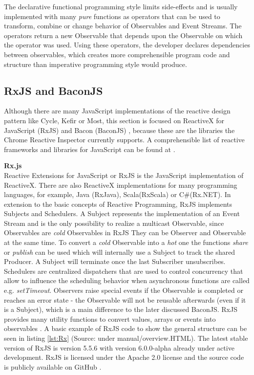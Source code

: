 	The declarative functional programming style limits side-effects and is usually implemented with many \emph{pure} functions as operators that can be used to transform, combine or change behavior of Observables and Event Streams. The operators return a new Observable that depends upon the Observable on which the operator was used. Using these operators, the developer declares dependencies between observables, which creates more comprehensible program code and structure \cite[Why Reactive Programming?]{ReactiveInspector} than imperative programming style would produce. 	


	\subsection{RxJS and BaconJS}
	Although there are many JavaScript implementations of the reactive design pattern like Cycle\cite{CycleJS}, Kefir\cite{KefirJS} or  Most\cite{MostJS}, this section is focused on ReactiveX for JavaScript (RxJS) \cite{RxJS} and Bacon (BaconJS) \cite{BaconJS}, because these are the libraries the Chrome Reactive Inspector currently supports. A comprehensible list of reactive frameworks and libraries for JavaScript can be found at \cite{FRPJSList}.
	
	\textbf{Rx.js}\\
	Reactive Extensions for JavaScript or RxJS is the JavaScript implementation of ReactiveX. There are also ReactiveX implementations for many programming languages, for example, Java (RxJava), Scala(RxScala) or C\#(Rx.NET). In extension to the basic concepts of Reactive Programming, RxJS implements Subjects and Schedulers. A Subject represents the implementation of an Event Stream and is the only possibility to realize a multicast Observable, since Observables are \emph{cold} Observables in RxJS They can be Observer and Observable at the same time. To convert a \emph{cold} Observable into a \emph{hot} one the functions \emph{share} or \emph{publish} can be used which will internally use a Subject to track the shared Producer. A Subject will terminate once the last Subscriber unsubscribes. Schedulers are centralized dispatchers that are used to control concurrency that allow to influence the scheduling behavior when asynchronous functions are called e.g. \emph{setTimeout}\cite{RxJsDocu}.
	Observers raise special events if the Observable is completed or reaches an error state - the Observable will not be reusable afterwards (even if it is a Subject), which is a main difference to the later discussed BaconJS. RxJS provides many utility functions to convert values, arrays or events into observables \cite{ThesisBaradur}. A basic example of RxJS code to show the general structure can be seen in listing \ref{lst:Rx} (Source: \cite{RxJsDocu} under manual/overview.HTML).
	The latest stable version of RxJS is version 5.5.6 with version 6.0.0-alpha already under active development. RxJS is licensed under the Apache 2.0 license and the source code is publicly available on GitHub \cite{RxJS}.

